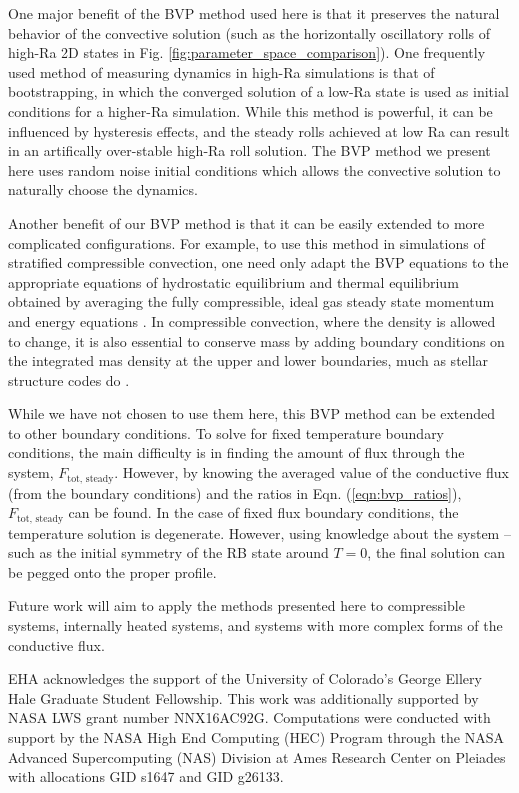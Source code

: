 \documentclass[aps, pre, onecolumn, nofootinbib, notitlepage, groupedaddress, amsfonts, amssymb, amsmath, longbibliography]{revtex4-1}
\begin{document}
One major benefit of the BVP method used here is that it preserves the natural behavior of 
the convective solution (such as the horizontally oscillatory rolls
of high-Ra 2D states in Fig. \ref{fig:parameter_space_comparison}).
One frequently used method of measuring dynamics in high-Ra simulations is that of bootstrapping,
in which the converged solution of a low-Ra state is used as initial conditions for a higher-Ra
simulation.  While this method is powerful, it can be influenced by hysteresis effects,
and the steady rolls achieved at low Ra can result in an artifically over-stable high-Ra
roll solution.  The BVP method we present here uses random noise initial conditions which allows the
convective solution to naturally choose the dynamics.

Another benefit of our BVP method is that it can be easily extended to more complicated
configurations.  For example, to use this method in simulations of stratified compressible convection,
one need only adapt the BVP equations to the appropriate equations of hydrostatic equilibrium
and thermal equilibrium obtained by averaging the fully compressible, ideal gas
steady state momentum and energy equations \cite{anders&brown2017, lecoanet&all2014}.
In compressible convection, where the density is allowed to change,
it is also essential to conserve mass by adding boundary conditions on the integrated mas density at
the upper and lower boundaries, much as stellar structure codes do \cite{paxton&all2011}.

While we have not chosen to use them here, this BVP method can be extended to other boundary conditions.  
To solve for fixed temperature boundary conditions, the 
main difficulty is in finding the amount of flux through the system, $F_{\text{tot, steady}}$.
However, by knowing the averaged value of the conductive flux (from the boundary conditions)
and the ratios in Eqn. (\ref{eqn:bvp_ratios}), $F_{\text{tot, steady}}$ can be found.
In the case of
fixed flux boundary conditions, the temperature solution is degenerate.
However, using knowledge about the system -- such as the initial symmetry of the
RB state around $T = 0$, the final solution can be pegged onto the proper profile.

Future work will aim to apply the methods presented here to compressible systems,
internally heated systems, and systems with more complex forms of the conductive flux.


\begin{acknowledgments}
EHA acknowledges the support of the University of Colorado's George 
Ellery Hale Graduate Student Fellowship.
This work was additionally supported by  NASA LWS grant number NNX16AC92G.  
Computations were conducted 
with support by the NASA High End Computing (HEC) Program through the NASA 
Advanced Supercomputing (NAS) Division at Ames Research Center on Pleiades
with allocations GID s1647 and GID g26133.
\end{acknowledgments}
\end{document}
